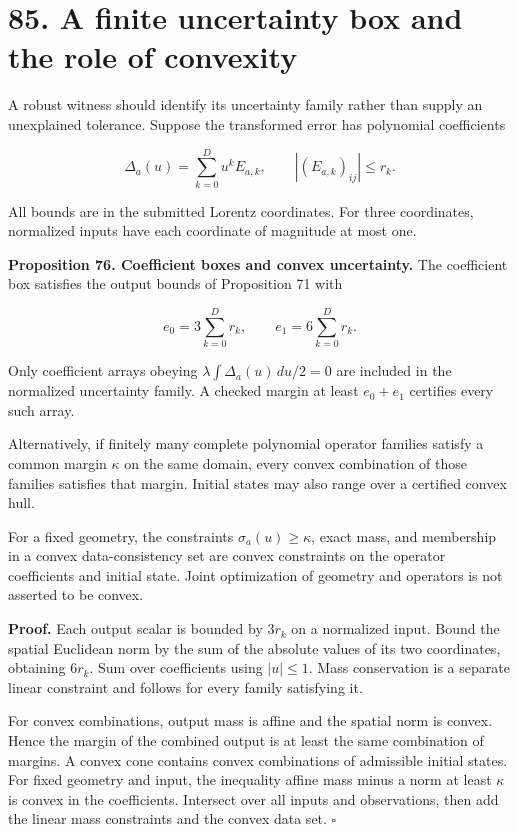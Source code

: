 \documentclass[11pt,letterpaper]{article}
\begin{document}
\section{85. A finite uncertainty box and the role of
convexity}\label{a-finite-uncertainty-box-and-the-role-of-convexity}

A robust witness should identify its uncertainty family rather than
supply an unexplained tolerance. Suppose the transformed error has
polynomial coefficients

\[
\Delta_a(u)=\sum_{k=0}^{D}u^kE_{a,k},\qquad
|(E_{a,k})_{ij}|\leq r_k.
\]

All bounds are in the submitted Lorentz coordinates. For three
coordinates, normalized inputs have each coordinate of magnitude at most
one.

\textbf{Proposition 76. Coefficient boxes and convex uncertainty.} The
coefficient box satisfies the output bounds of Proposition 71 with

\[
\boxed{e_0=3\sum_{k=0}^{D}r_k,\qquad e_1=6\sum_{k=0}^{D}r_k.}
\]

Only coefficient arrays obeying \(\lambda\int\Delta_a(u)\,du/2=0\) are
included in the normalized uncertainty family. A checked margin at least
\(e_0+e_1\) certifies every such array.

Alternatively, if finitely many complete polynomial operator families
satisfy a common margin \(\kappa\) on the same domain, every convex
combination of those families satisfies that margin. Initial states may
also range over a certified convex hull.

For a fixed geometry, the constraints \(\sigma_a(u)\geq\kappa\), exact
mass, and membership in a convex data-consistency set are convex
constraints on the operator coefficients and initial state. Joint
optimization of geometry and operators is not asserted to be convex.

\textbf{Proof.} Each output scalar is bounded by \(3r_k\) on a
normalized input. Bound the spatial Euclidean norm by the sum of the
absolute values of its two coordinates, obtaining \(6r_k\). Sum over
coefficients using \(|u|\leq1\). Mass conservation is a separate linear
constraint and follows for every family satisfying it.

For convex combinations, output mass is affine and the spatial norm is
convex. Hence the margin of the combined output is at least the same
combination of margins. A convex cone contains convex combinations of
admissible initial states. For fixed geometry and input, the inequality
affine mass minus a norm at least \(\kappa\) is convex in the
coefficients. Intersect over all inputs and observations, then add the
linear mass constraints and the convex data set. \(\square\)
\end{document}
